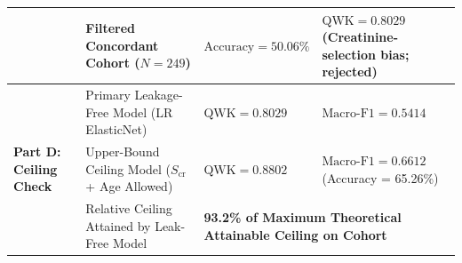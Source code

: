 \documentclass{IEEEtran}
\begin{document}
\begin{table}[t]
\begin{tabularx}{\textwidth}{p{3.2cm}p{4.5cm}p{2.2cm}X}
& Filtered Concordant Cohort ($N = 249$) & $\text{Accuracy} = 50.06\%$ & $\text{QWK} = 0.8029$ (Creatinine-selection bias; rejected) \\
\midrule
\multirow{3}{*}{\textbf{Part D: Ceiling Check}} 
& Primary Leakage-Free Model (LR ElasticNet) & $\text{QWK} = 0.8029$ & $\text{Macro-F1} = 0.5414$ \\
& Upper-Bound Ceiling Model ($S_{\text{cr}}$ + Age Allowed) & $\text{QWK} = \mathbf{0.8802}$ & $\text{Macro-F1} = \mathbf{0.6612}$ (Accuracy = 65.26\%) \\
& Relative Ceiling Attained by Leak-Free Model & \multicolumn{2}{l}{\textbf{93.2\% of Maximum Theoretical Attainable Ceiling on Cohort}} \\
\bottomrule
\end{tabularx}
\end{table}
\end{document}
